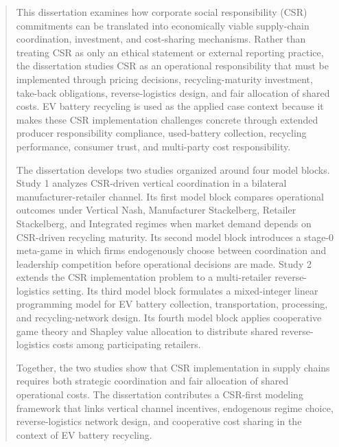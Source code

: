 \documentclass[12pt,a4paper]{report}
\newcommand{\textpages}{\clearpage\pagenumbering{arabic}}
\begin{document}
\begin{abstract}           %
\par
This dissertation examines how corporate social responsibility (CSR) commitments can be translated into economically viable supply-chain coordination, investment, and cost-sharing mechanisms. Rather than treating CSR as only an ethical statement or external reporting practice, the dissertation studies CSR as an operational responsibility that must be implemented through pricing decisions, recycling-maturity investment, take-back obligations, reverse-logistics design, and fair allocation of shared costs. EV battery recycling is used as the applied case context because it makes these CSR implementation challenges concrete through extended producer responsibility compliance, used-battery collection, recycling performance, consumer trust, and multi-party cost responsibility.

The dissertation develops two studies organized around four model blocks. Study 1 analyzes CSR-driven vertical coordination in a bilateral manufacturer-retailer channel. Its first model block compares operational outcomes under Vertical Nash, Manufacturer Stackelberg, Retailer Stackelberg, and Integrated regimes when market demand depends on CSR-driven recycling maturity. Its second model block introduces a stage-0 meta-game in which firms endogenously choose between coordination and leadership competition before operational decisions are made. Study 2 extends the CSR implementation problem to a multi-retailer reverse-logistics setting. Its third model block formulates a mixed-integer linear programming model for EV battery collection, transportation, processing, and recycling-network design. Its fourth model block applies cooperative game theory and Shapley value allocation to distribute shared reverse-logistics costs among participating retailers.

Together, the two studies show that CSR implementation in supply chains requires both strategic coordination and fair allocation of shared operational costs. The dissertation contributes a CSR-first modeling framework that links vertical channel incentives, endogenous regime choice, reverse-logistics network design, and cooperative cost sharing in the context of EV battery recycling.


\end{abstract}




\textpages     %
\end{document}
